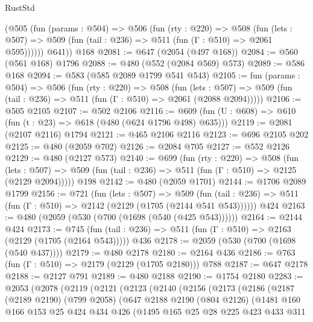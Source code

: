 \begin{lexlean}{RustStd}
\begin{coremodule}
        (@505
          (fun (params : @504) =>
          @506
            (fun (rty : @220) =>
            @508
              (fun (lets : @507) =>
              @509 (fun (tail : @236) => @511 (fun (Γ : @510) => @2061 @595))))))
        @641))
    @168
@2081 := @647 (@2054 (@497 @168))
@2084 := @560 (@561 @168) @1796
@2088 := @480 (@552 (@2084 @569) @573)
@2089 := @586 @168
@2094 := @583 (@585 @2089 @1799 @541 @543)
@2105 := fun (params : @504) =>
  @506
    (fun (rty : @220) =>
    @508
      (fun (lets : @507) =>
      @509 (fun (tail : @236) => @511 (fun (Γ : @510) => @2061 (@2088 @2094)))))
@2106 := @505 @2105
@2107 := @502 @2106
@2116 := @609 (fun (U : @608) => @610 (fun (t : @23) => @618 (@480 (@624 @1796 @498) @635)))
@2119 := @2081 (@2107 @2116) @1794
@2121 := @465 @2106 @2116
@2123 := @696 @2105 @202
@2125 := @480 (@2059 @702)
@2126 := @2084 @705
@2127 := @552 @2126
@2129 := @480 (@2127 @573)
@2140 := @699
    (fun (rty : @220) =>
    @508
      (fun (lets : @507) =>
      @509 (fun (tail : @236) => @511 (fun (Γ : @510) => @2125 (@2129 @2094)))))
    @198
@2142 := @480 (@2059 @1701)
@2144 := @1706 @2089 @1799
@2156 := @721
    (fun (lets : @507) =>
    @509 (fun (tail : @236) => @511 (fun (Γ : @510) => @2142 (@2129 (@1705 (@2144 @541 @543))))))
    @424
@2163 := @480 (@2059 (@530 (@700 (@1698 (@540 (@425 @543))))))
@2164 := @2144 @424
@2173 := @745
    (fun (tail : @236) => @511 (fun (Γ : @510) => @2163 (@2129 (@1705 (@2164 @543)))))
    @436
@2178 := @2059 (@530 (@700 (@1698 (@540 @437))))
@2179 := @480 @2178
@2180 := @2164 @436
@2186 := @763 (fun (Γ : @510) => @2179 (@2129 (@1705 @2180))) @788
@2187 := @647 @2178
@2188 := @2127 @791
@2189 := @480 @2188
@2190 := @1754 @2180
@2283 := @2053
    (@2078
      (@2119
        (@2121
          (@2123
            (@2140
              (@2156
                (@2173
                  (@2186
                    (@2187
                      (@2189 @2190)
                      (@799 @2058)
                      (@647
                        @2188
                        @2190
                        (@804 @2126)
                        (@1481
                          @160
                          @166
                          @153
                          @25
                          @424
                          @434
                          @426
                          (@1495
                            @165
                            @25
                            @28
                            @225
                            @423
                            @433
                            @311

\end{coremodule}
\end{lexlean}
